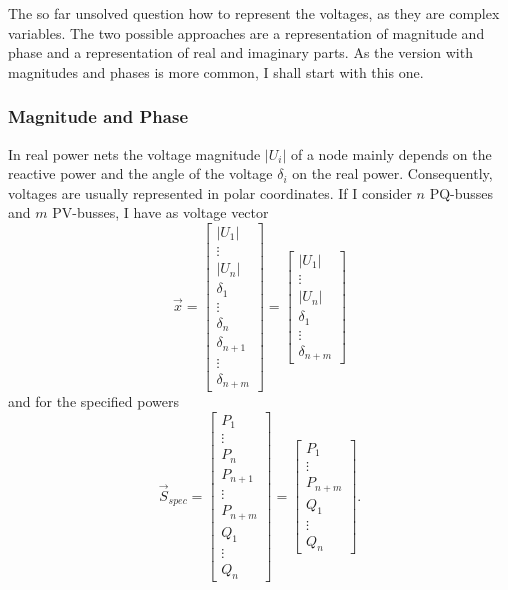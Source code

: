 The so far unsolved question how to represent the voltages, as they are complex variables. The two possible approaches are a representation of magnitude and phase and a representation of real and imaginary parts. As the version with magnitudes and phases is more common, I shall start with this one.

\subsubsection{Magnitude and Phase}
In real power nets the voltage magnitude $|U_i|$ of a node mainly depends on the reactive power and the angle of the voltage $\delta_i$ on the real power. Consequently, voltages are usually represented in polar coordinates. If I consider $n$ PQ-busses and $m$ PV-busses, I have as voltage vector 
\begin{equation}
	\vec x = 
	\begin{bmatrix}
		|U_1| \\
		\vdots \\
		|U_n| \\
		\delta_1 \\
		\vdots \\
		\delta_n \\
		\delta_{n + 1} \\
		\vdots \\
		\delta_{n + m} 
	\end{bmatrix} = 	
	\begin{bmatrix}
		|U_1| \\
		\vdots \\
		|U_n| \\
		\delta_1 \\
		\vdots \\
		\delta_{n + m} 
	\end{bmatrix}
\end{equation}
and for the specified powers
\begin{equation}
	\vec S_{spec} = 
	\begin{bmatrix}
		P_1 \\
		\vdots \\
		P_n \\
		P_{n + 1} \\
		\vdots \\
		P_{n + m} \\
		Q_1 \\
		\vdots \\
		Q_n
	\end{bmatrix} = 
	\begin{bmatrix}
		P_1 \\
		\vdots \\
		P_{n + m} \\
		Q_1 \\
		\vdots \\
		Q_n
	\end{bmatrix}.
\end{equation}

